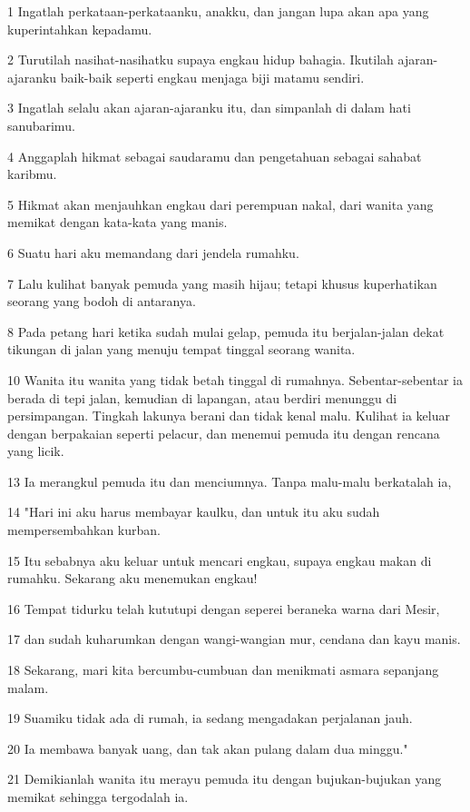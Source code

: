 \par 1 Ingatlah perkataan-perkataanku, anakku, dan jangan lupa akan apa yang kuperintahkan kepadamu.
\par 2 Turutilah nasihat-nasihatku supaya engkau hidup bahagia. Ikutilah ajaran-ajaranku baik-baik seperti engkau menjaga biji matamu sendiri.
\par 3 Ingatlah selalu akan ajaran-ajaranku itu, dan simpanlah di dalam hati sanubarimu.
\par 4 Anggaplah hikmat sebagai saudaramu dan pengetahuan sebagai sahabat karibmu.
\par 5 Hikmat akan menjauhkan engkau dari perempuan nakal, dari wanita yang memikat dengan kata-kata yang manis.
\par 6 Suatu hari aku memandang dari jendela rumahku.
\par 7 Lalu kulihat banyak pemuda yang masih hijau; tetapi khusus kuperhatikan seorang yang bodoh di antaranya.
\par 8 Pada petang hari ketika sudah mulai gelap, pemuda itu berjalan-jalan dekat tikungan di jalan yang menuju tempat tinggal seorang wanita.
\par 10 Wanita itu wanita yang tidak betah tinggal di rumahnya. Sebentar-sebentar ia berada di tepi jalan, kemudian di lapangan, atau berdiri menunggu di persimpangan. Tingkah lakunya berani dan tidak kenal malu. Kulihat ia keluar dengan berpakaian seperti pelacur, dan menemui pemuda itu dengan rencana yang licik.
\par 13 Ia merangkul pemuda itu dan menciumnya. Tanpa malu-malu berkatalah ia,
\par 14 "Hari ini aku harus membayar kaulku, dan untuk itu aku sudah mempersembahkan kurban.
\par 15 Itu sebabnya aku keluar untuk mencari engkau, supaya engkau makan di rumahku. Sekarang aku menemukan engkau!
\par 16 Tempat tidurku telah kututupi dengan seperei beraneka warna dari Mesir,
\par 17 dan sudah kuharumkan dengan wangi-wangian mur, cendana dan kayu manis.
\par 18 Sekarang, mari kita bercumbu-cumbuan dan menikmati asmara sepanjang malam.
\par 19 Suamiku tidak ada di rumah, ia sedang mengadakan perjalanan jauh.
\par 20 Ia membawa banyak uang, dan tak akan pulang dalam dua minggu."
\par 21 Demikianlah wanita itu merayu pemuda itu dengan bujukan-bujukan yang memikat sehingga tergodalah ia.
